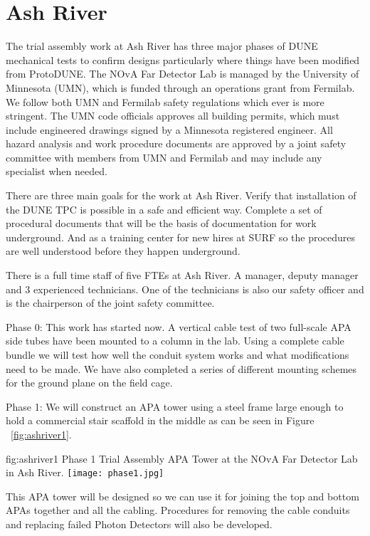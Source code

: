 \section{Ash River}

The trial assembly work at Ash River has three major phases of DUNE
mechanical tests to confirm designs particularly where things have
been modified from ProtoDUNE.  The NOvA Far Detector Lab is managed by
the University of Minnesota (UMN), which is funded through an
operations grant from Fermilab.  We follow both UMN and Fermilab
safety regulations which ever is more stringent.  The UMN code
officials approves all building permits, which must include engineered
drawings signed by a Minnesota registered engineer. All hazard
analysis and work procedure documents are approved by a joint safety
committee with members from UMN and Fermilab and may include any
specialist when needed.

There are three main goals for the work at Ash River. Verify that
installation of the DUNE TPC is possible in a safe and efficient
way. Complete a set of procedural documents that will be the basis of
documentation for work underground.  And as a training center for new
hires at SURF so the procedures are well understood before they happen
underground.

There is a full time staff of five FTEs at Ash River. A manager,
deputy manager and 3 experienced technicians.  One of the technicians
is also our safety officer and is the chairperson of the joint safety
committee.


Phase 0: This work has started now.  A vertical cable test of two
full-scale APA side tubes have been mounted to a column in the
lab. Using a complete cable bundle we will test how well the conduit
system works and what modifications need to be made. We have also
completed a series of different mounting schemes for the ground plane
on the field cage.

Phase 1: We will construct an APA tower using a steel frame large
enough to hold a commercial stair scaffold in the middle as can be
seen in Figure ~\ref{fig:ashriver1}.
\begin{dunefigure}{fig:ashriver1}
  {Phase 1 Trial Assembly APA Tower at the NOvA Far Detector Lab in Ash River.}
  \texttt{[image: phase1.jpg]}
\end{dunefigure}
This APA tower will be designed so we can
use it for joining the top and bottom APAs together and all the
cabling. Procedures for removing the cable conduits and replacing
failed Photon Detectors will also be developed.


